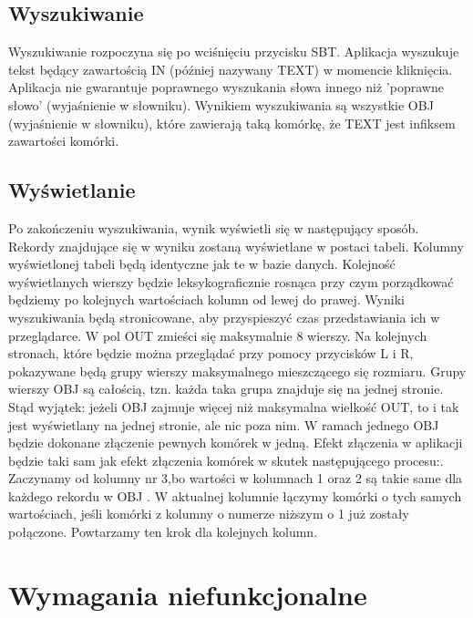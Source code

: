 \documentclass[10pt, a4paper]{article}
\begin{document}
\subsection{Wyszukiwanie}
Wyszukiwanie rozpoczyna się po wciśnięciu przycisku SBT.
Aplikacja wyszukuje tekst będący zawartością IN (później nazywany TEXT) w momencie kliknięcia. \newline
Aplikacja nie gwarantuje poprawnego wyszukania słowa innego niż 'poprawne słowo' (wyjaśnienie w słowniku).\newline
Wynikiem wyszukiwania są wszystkie OBJ (wyjaśnienie w słowniku), które zawierają taką komórkę, że TEXT jest infiksem zawartości komórki.
\subsection{Wyświetlanie}
Po zakończeniu wyszukiwania, wynik wyświetli się w następujący sposób. \newline
Rekordy znajdujące się w wyniku zostaną wyświetlane w postaci tabeli. Kolumny wyświetlonej tabeli będą identyczne jak te w bazie danych. Kolejność wyświetlanych wierszy będzie leksykograficznie rosnąca przy czym porządkować będziemy po kolejnych wartościach kolumn od lewej do prawej. \newline
Wyniki wyszukiwania będą stronicowane, aby przyspieszyć czas przedstawiania ich w przeglądarce. W pol OUT zmieści się maksymalnie 8 wierszy. Na kolejnych stronach, które będzie można przeglądać przy pomocy przycisków L i R, pokazywane będą grupy wierszy maksymalnego mieszczącego się rozmiaru. Grupy wierszy OBJ są całością, tzn. każda taka grupa znajduje się na jednej stronie. Stąd wyjątek: jeżeli OBJ zajmuje więcej niż maksymalna wielkość OUT, to i tak jest wyświetlany na jednej stronie, ale nic poza nim.\newline 
W ramach jednego OBJ będzie dokonane złączenie pewnych komórek w jedną. Efekt złączenia w aplikacji będzie taki sam jak efekt złączenia komórek w skutek następującego procesu:. Zaczynamy od kolumny nr 3,bo wartości w kolumnach 1 oraz 2 są takie same dla każdego rekordu w OBJ . W aktualnej kolumnie łączymy komórki o tych samych wartościach, jeśli komórki z kolumny o numerze niższym o 1 już zostały połączone. Powtarzamy ten krok dla kolejnych kolumn.
\newline
\section{Wymagania niefunkcjonalne}
\end{document}
